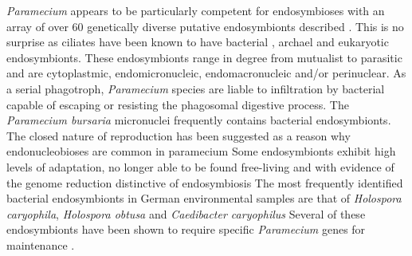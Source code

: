 \textit{Paramecium} appears to be particularly competent for endosymbioses with an array of over 60 
genetically diverse putative endosymbionts described \citep{Gortz2009}. 
This is no surprise as ciliates have been known to have bacterial \citep{Gortz2009}, archael \citep{Wrede2012} and 
eukaryotic \citep{Kodama2009a} endosymbionts.
These endosymbionts range in degree from mutualist to parasitic and are cytoplastmic, endomicronucleic,
endomacronucleic and/or perinuclear. 
As a serial phagotroph, \textit{Paramecium} species are liable to infiltration by bacterial capable of escaping or resisting
the phagosomal digestive process. %
The \textit{Paramecium bursaria} micronuclei frequently contains bacterial endosymbionts. The closed nature of reproduction
has been suggested as a reason why endonucleobioses are common in paramecium \citep{Gortz2009}
Some endosymbionts exhibit high levels of adaptation, no longer able to be found free-living and with evidence of the genome reduction
distinctive of endosymbiosis \citep{Gortz2009} %
The most frequently identified bacterial endosymbionts in German environmental samples are that of \textit{Holospora  caryophila},
\textit{Holospora obtusa} and \textit{Caedibacter caryophilus}
Several of these endosymbionts have been shown to require specific \textit{Paramecium} genes for maintenance \cite{Dohra1998}.


%

%





